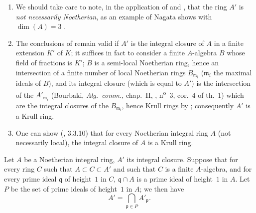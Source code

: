 \begin{remarks}[23.2.8]
\label{0.23.2.8}
\medskip\noindent
\begin{enumerate}
  \item[{\rm(i)}] We should take care to note, in the application of  and , that the ring $A'$ is \emph{not necessarily Noetherian}, as an example of Nagata shows with $\dim(A)=3$ \cite{IV-30}.
  \item[{\rm(ii)}] The conclusions of  remain valid if $A'$ is the integral closure of $A$ in a finite extension $K'$ of $K$; it suffices in fact to consider a finite $A$-algebra $B$ whose field of fractions is $K'$; $B$ is a semi-local Noetherian ring, hence an intersection of a finite number of local Noetherian rings $B_{\mathfrak{m}_i}$ ($\mathfrak{m}_i$ the maximal ideals of $B$), and its integral closure (which is equal to $A'$) is the intersection of the $A'_{\mathfrak{m}_i}$ (Bourbaki, \emph{Alg.~comm.}, chap.~II, , n\textsuperscript{o}~3, cor.~4 of th.~1) which are the integral closures of the $B_{\mathfrak{m}_i}$, hence Krull rings by ; consequently $A'$ is a Krull ring.
  \item[{\rm(iii)}] One can show (\cite{IV-30}, 3.3.10) that for every Noetherian integral ring $A$ (not necessarily local), the integral closure of $A$ is a Krull ring.
\end{enumerate}
\end{remarks}

\begin{corollary}[23.2.9]
\label{0.23.2.9}
Let $A$ be a Noetherian integral ring, $A'$ its integral closure.
Suppose that for every ring $C$ such that $A\subset C\subset A'$ and such that $C$ is a finite $A$-algebra, and for every prime ideal $\mathfrak{q}$ of height~$1$ in $C$, $\mathfrak{q}\cap A$ is a prime ideal of height~$1$ in $A$.
Let $P$ be the set of prime ideals of height~$1$ in $A$; we then have
\[
  A'=\bigcap_{\mathfrak{p}\in P}A'_\mathfrak{p}.
\]
\end{corollary}

